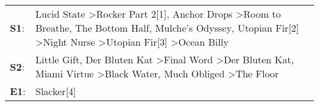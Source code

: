 \begin{supertabular}{p{0.03\textwidth}p{0.92\textwidth}}
 \textbf{S1}:  &  Lucid State\textsuperscript{} \textgreater \enspace Rocker Part 2[1]\textsuperscript{}, \enspace Anchor Drops\textsuperscript{} \textgreater \enspace Room to Breathe\textsuperscript{}, \enspace The Bottom Half\textsuperscript{}, \enspace Mulche's Odyssey\textsuperscript{}, \enspace Utopian Fir[2]\textsuperscript{} \textgreater \enspace Night Nurse\textsuperscript{} \textgreater \enspace Utopian Fir[3]\textsuperscript{} \textgreater \enspace Ocean Billy\textsuperscript{}  \enspace  \\
 \textbf{S2}:  &                                                                                                                  Little Gift\textsuperscript{}, \enspace Der Bluten Kat\textsuperscript{} \textgreater \enspace Final Word\textsuperscript{} \textgreater \enspace Der Bluten Kat\textsuperscript{}, \enspace Miami Virtue\textsuperscript{} \textgreater \enspace Black Water\textsuperscript{}, \enspace Much Obliged\textsuperscript{} \textgreater \enspace The Floor\textsuperscript{}  \enspace  \\
 \textbf{E1}:  &                                                                                                                                                                                                                                                                                                                                                                                                                                                                Slacker[4]\textsuperscript{}  \enspace  \\
\end{supertabular}
